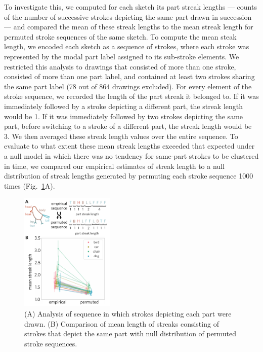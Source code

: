 \documentclass[10pt,letterpaper]{article}
\begin{document}
To investigate this, we computed for each sketch its part streak lengths — counts of the number of successive strokes depicting the same part drawn in succession — and compared the mean of these streak lengths to the mean streak length for permuted stroke sequences of the same sketch. 
To compute the mean steak length, we encoded each sketch as a sequence of strokes, where each stroke was represented by the modal part label assigned to its sub-stroke elements. 
We restricted this analysis to drawings that consisted of more than one stroke, consisted of more than one part label, and contained at least two strokes sharing the same part label (78 out of 864 drawings excluded). 
For every element of the stroke sequence, we recorded the length of the part streak it belonged to. 
If it was immediately followed by a stroke depicting a different part, the streak length would be 1. 
If it was immediately followed by two strokes depicting the same part, before switching to a stroke of a different part, the streak length would be 3. 
We then averaged these streak length values over the entire sequence. 
To evaluate to what extent these mean streak lengths exceeded that expected under a null model in which there was no tendency for same-part strokes to be clustered in time, we compared our empirical estimates of streak length to a null distribution of streak lengths generated by permuting each stroke sequence 1000 times (Fig.~\ref{stroke_sequence_fig}A). 

\begin{figure}[ht]
\centering
\includegraphics[width=0.4\textwidth]{figures/6_part_sequence.pdf}
\caption{(A) Analysis of sequence in which strokes depicting each part were drawn. (B) Comparison of mean length of streaks consisting of strokes that depict the same part with null distribution of permuted stroke sequences.}
\label{stroke_sequence_fig}
\end{figure}
\end{document}
